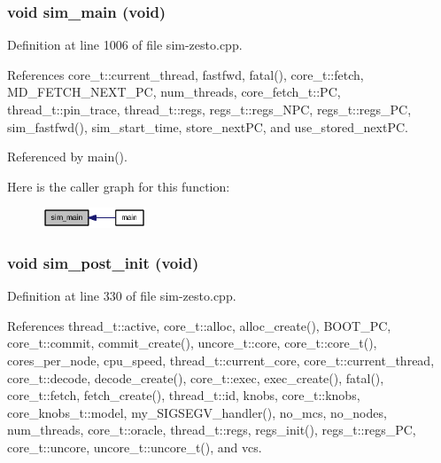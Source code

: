 \subsubsection[{sim\_\-main}]{\setlength{\rightskip}{0pt plus 5cm}void sim\_\-main (void)}\label{sim-zesto_8cpp_6b9951fa76e6d8b400f13df1c975ed3b}




Definition at line 1006 of file sim-zesto.cpp.

References core\_\-t::current\_\-thread, fastfwd, fatal(), core\_\-t::fetch, MD\_\-FETCH\_\-NEXT\_\-PC, num\_\-threads, core\_\-fetch\_\-t::PC, thread\_\-t::pin\_\-trace, thread\_\-t::regs, regs\_\-t::regs\_\-NPC, regs\_\-t::regs\_\-PC, sim\_\-fastfwd(), sim\_\-start\_\-time, store\_\-nextPC, and use\_\-stored\_\-nextPC.

Referenced by main().

Here is the caller graph for this function:\nopagebreak
\begin{figure}[H]
\begin{center}
\leavevmode
\includegraphics[width=88pt]{sim-zesto_8cpp_6b9951fa76e6d8b400f13df1c975ed3b_icgraph}
\end{center}
\end{figure}
\subsubsection[{sim\_\-post\_\-init}]{\setlength{\rightskip}{0pt plus 5cm}void sim\_\-post\_\-init (void)}\label{sim-zesto_8cpp_7af633ff74aee8f90ea9a610892191ce}




Definition at line 330 of file sim-zesto.cpp.

References thread\_\-t::active, core\_\-t::alloc, alloc\_\-create(), BOOT\_\-PC, core\_\-t::commit, commit\_\-create(), uncore\_\-t::core, core\_\-t::core\_\-t(), cores\_\-per\_\-node, cpu\_\-speed, thread\_\-t::current\_\-core, core\_\-t::current\_\-thread, core\_\-t::decode, decode\_\-create(), core\_\-t::exec, exec\_\-create(), fatal(), core\_\-t::fetch, fetch\_\-create(), thread\_\-t::id, knobs, core\_\-t::knobs, core\_\-knobs\_\-t::model, my\_\-SIGSEGV\_\-handler(), no\_\-mcs, no\_\-nodes, num\_\-threads, core\_\-t::oracle, thread\_\-t::regs, regs\_\-init(), regs\_\-t::regs\_\-PC, core\_\-t::uncore, uncore\_\-t::uncore\_\-t(), and vcs.

